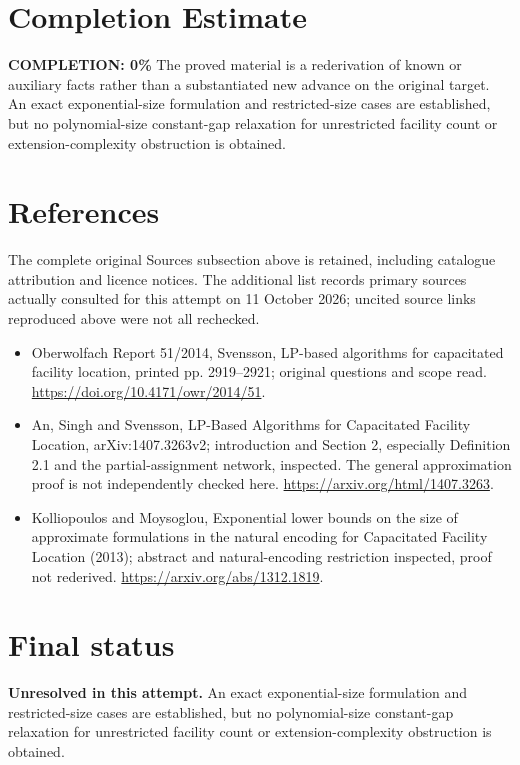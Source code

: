\documentclass[11pt]{article}
\begin{document}
\section{Completion Estimate}
\noindent\textbf{COMPLETION: 0\%}
The proved material is a rederivation of known or auxiliary facts rather than a substantiated new advance on the original target. An exact exponential-size formulation and restricted-size cases are established, but no polynomial-size constant-gap relaxation for unrestricted facility count or extension-complexity obstruction is obtained.
\section{References}
The complete original Sources subsection above is retained, including catalogue attribution and licence notices. The additional list records primary sources actually consulted for this attempt on 11 October 2026; uncited source links reproduced above were not all rechecked.
\begin{itemize}
\item Oberwolfach Report 51/2014, Svensson, LP-based algorithms for capacitated facility location, printed pp. 2919--2921; original questions and scope read. \url{https://doi.org/10.4171/owr/2014/51}.
\item An, Singh and Svensson, LP-Based Algorithms for Capacitated Facility Location, arXiv:1407.3263v2; introduction and Section 2, especially Definition 2.1 and the partial-assignment network, inspected. The general approximation proof is not independently checked here. \url{https://arxiv.org/html/1407.3263}.
\item Kolliopoulos and Moysoglou, Exponential lower bounds on the size of approximate formulations in the natural encoding for Capacitated Facility Location (2013); abstract and natural-encoding restriction inspected, proof not rederived. \url{https://arxiv.org/abs/1312.1819}.
\end{itemize}
\section{Final status}
\textbf{Unresolved in this attempt.} An exact exponential-size formulation and restricted-size cases are established, but no polynomial-size constant-gap relaxation for unrestricted facility count or extension-complexity obstruction is obtained.
\end{document}
